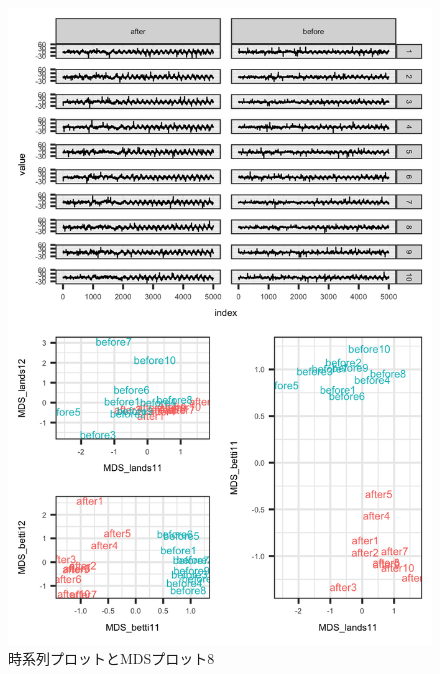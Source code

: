 \documentclass{jarticle}
\begin{document}
\begin{figure}[H]
	\begin{center}
		\includegraphics[width=15cm]{fig/MDS_plot8.png}
		\caption{時系列プロットとMDSプロット8}
		\label{fig:MDS_plot8}
	\end{center}
\end{figure}
\end{document}
